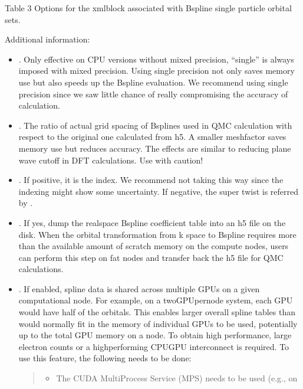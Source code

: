 \documentclass[letterpaper,10pt,english]{sphinxmanual}
\begin{document}
\begin{center}Table 3 Options for the  xml\sphinxhyphen{}block associated with B\sphinxhyphen{}spline single particle orbital sets.
\end{center}
Additional information:
\begin{itemize}
\item {} 
. Only effective on CPU versions without mixed
precision, “single” is always imposed with mixed precision. Using
single precision not only saves memory use but also speeds up the
B\sphinxhyphen{}spline evaluation. We recommend using single precision since we saw
little chance of really compromising the accuracy of calculation.

\item {} 
. The ratio of actual grid spacing of B\sphinxhyphen{}splines used in
QMC calculation with respect to the original one calculated from h5.
A smaller meshfactor saves memory use but reduces accuracy. The
effects are similar to reducing plane wave cutoff in DFT
calculations. Use with caution!

\item {} 
. If positive, it is the index. We recommend not taking
this way since the indexing might show some uncertainty. If negative,
the super twist is referred by .

\item {} 
. If yes, dump the real\sphinxhyphen{}space B\sphinxhyphen{}spline coefficient
table into an h5 file on the disk. When the orbital transformation
from k space to B\sphinxhyphen{}spline requires more than the available amount of
scratch memory on the compute nodes, users can perform this step on
fat nodes and transfer back the h5 file for QMC calculations.

\item {} 
. If enabled, spline data is shared across multiple
GPUs on a given computational node. For example, on a
two\sphinxhyphen{}GPU\sphinxhyphen{}per\sphinxhyphen{}node system, each GPU would have half of the orbitals.
This enables larger overall spline tables than would normally fit in
the memory of individual GPUs to be used, potentially up to the total
GPU memory on a node. To obtain high performance, large electron
counts or a high\sphinxhyphen{}performing CPU\sphinxhyphen{}GPU interconnect is required. To use
this feature, the following needs to be done:
\begin{quote}
\begin{itemize}
\item {} 
The CUDA Multi\sphinxhyphen{}Process Service (MPS) needs to be used (e.g., on


\end{itemize}
\end{quote}
\end{itemize}
\end{document}
